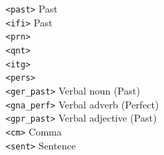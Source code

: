 \documentclass[a0paper,fontscale=0.3]{baposter}  %
\begin{document}
\begin{poster}
{\begin{multicols}{3}
\begin{tabbing}
  \texttt{{\small <past>}} \> Past\\[-0.5ex]
  \texttt{{\small <ifi>}} \> Past\\[-0.5ex]
  \texttt{{\small <prn>}} \> \\[-0.5ex]
  \texttt{{\small <qnt>}} \> \\[-0.5ex]
  \texttt{{\small <itg>}} \> \\[-0.5ex]
  \texttt{{\small <pers>}} \> \\[-0.5ex]
  \texttt{{\small <ger\_past>}} \> Verbal noun (Past)\\[-0.5ex]
  \texttt{{\small <gna\_perf>}} \> Verbal adverb (Perfect)\\[-0.5ex]
  \texttt{{\small <gpr\_past>}} \> Verbal adjective (Past)\\[-0.5ex]
  \texttt{{\small <cm>}} \> Comma\\[-0.5ex]
  \texttt{{\small <sent>}} \> Sentence\\
  
\end{tabbing}
\end{multicols}

		}


\end{poster}
\end{document}
